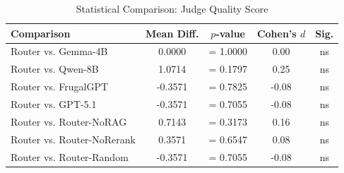 \begin{table}[H]
\centering
\caption{Statistical Comparison: Judge Quality Score}
\label{tab:stats_judge}
\begin{tabular}{lcccc}
\toprule
\textbf{Comparison} & \textbf{Mean Diff.} & \textbf{$p$-value} & \textbf{Cohen's $d$} & \textbf{Sig.} \\ \midrule
Router vs. Gemma-4B & 0.0000 & = 1.0000 & 0.00 & ns \\ 
Router vs. Qwen-8B & 1.0714 & = 0.1797 & 0.25 & ns \\ 
Router vs. FrugalGPT & -0.3571 & = 0.7825 & -0.08 & ns \\ 
Router vs. GPT-5.1 & -0.3571 & = 0.7055 & -0.08 & ns \\ 
Router vs. Router-NoRAG & 0.7143 & = 0.3173 & 0.16 & ns \\ 
Router vs. Router-NoRerank & 0.3571 & = 0.6547 & 0.08 & ns \\ 
Router vs. Router-Random & -0.3571 & = 0.7055 & -0.08 & ns \\ 
\bottomrule
\end{tabular}
\end{table}

